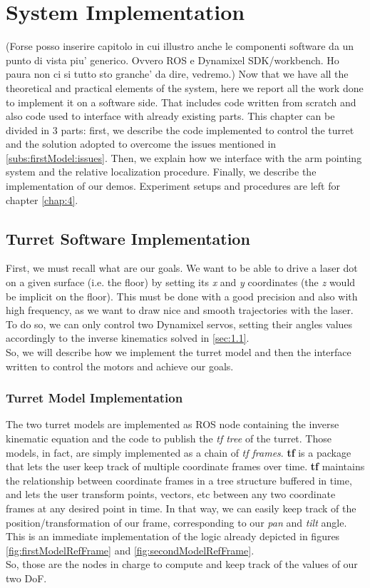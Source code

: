 \chapter{System Implementation}\label{chap:3}
(Forse posso inserire capitolo in cui illustro anche le componenti software da un punto di vista piu' generico. Ovvero ROS e Dynamixel SDK/workbench. Ho paura non ci si tutto sto granche' da dire, vedremo.)
Now that we have all the theoretical and practical elements of the system, here we report all the work done to implement it on a software side. That includes code written from scratch and also code used to interface with already existing parts. This chapter can be divided in 3 parts: first, we describe the code implemented to control the turret and the solution adopted to overcome the issues mentioned in \ref{subs:firstModel:issues}. Then, we explain how we interface with the arm pointing system and the relative localization procedure. Finally, we describe the implementation of our demos. Experiment setups and procedures are left for chapter \ref{chap:4}.
\section{Turret Software Implementation}
First, we must recall what are our goals. We want to be able to drive a laser dot on a given surface (i.e. the floor) by setting its \emph{x} and \emph{y} coordinates (the \emph{z} would be implicit on the floor). This must be done with a good precision and also with high frequency, as we want to draw nice and smooth trajectories with the laser. To do so, we can only control two Dynamixel servos, setting their angles values accordingly to the inverse kinematics solved in \ref{sec:1.1}.\\
So, we will describe how we implement the turret model and then the interface written to control the motors and achieve our goals.
\subsection{Turret Model Implementation}
The two turret models are implemented as ROS node containing the inverse kinematic equation and the code to publish the \emph{tf tree} of the turret. Those models, in fact, are simply implemented as a chain of \emph{tf frames}. \textbf{tf} is a package that lets the user keep track of multiple coordinate frames over time. \textbf{tf} maintains the relationship between coordinate frames in a tree structure buffered in time, and lets the user transform points, vectors, etc between any two coordinate frames at any desired point in time. In that way, we can easily keep track of the position/transformation of our frame, corresponding to our \emph{pan} and \emph{tilt} angle. This is an immediate implementation of the logic already depicted in figures \ref{fig:firstModelRefFrame} and \ref{fig:secondModelRefFrame}.\\
So, those are the nodes in charge to compute and keep track of the values of our two DoF.


